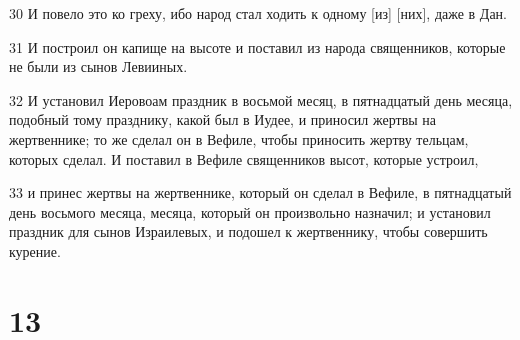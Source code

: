 \par 30 И повело это ко греху, ибо народ стал ходить к одному [из] [них], даже в Дан.
\par 31 И построил он капище на высоте и поставил из народа священников, которые не были из сынов Левииных.
\par 32 И установил Иеровоам праздник в восьмой месяц, в пятнадцатый день месяца, подобный тому празднику, какой был в Иудее, и приносил жертвы на жертвеннике; то же сделал он в Вефиле, чтобы приносить жертву тельцам, которых сделал. И поставил в Вефиле священников высот, которые устроил,
\par 33 и принес жертвы на жертвеннике, который он сделал в Вефиле, в пятнадцатый день восьмого месяца, месяца, который он произвольно назначил; и установил праздник для сынов Израилевых, и подошел к жертвеннику, чтобы совершить курение.

\chapter{13}

